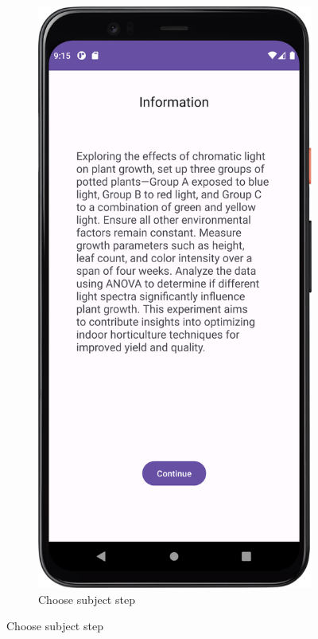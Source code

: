 \begin{figure}[htbp]
\begin{subfigure}[b]{0.25\textwidth}
        \includegraphics[width=\textwidth]{content/06_demonstration_of_the_artifact/Screenshot_InfoScreen.png}
        \caption{Choose subject step}

\end{subfigure}
\end{figure}
